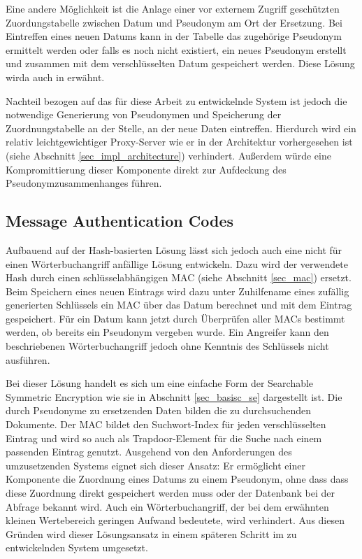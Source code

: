 Eine andere Möglichkeit ist die Anlage einer vor externem Zugriff geschützten Zuordungstabelle zwischen Datum und Pseudonym am Ort der Ersetzung. Bei Eintreffen eines neuen Datums kann in der Tabelle das zugehörige Pseudonym ermittelt werden oder falls es noch nicht existiert, ein neues Pseudonym erstellt und zusammen mit dem verschlüsselten Datum gespeichert werden. Diese Lösung wirda auch in \cite{goh2003} erwähnt.

Nachteil bezogen auf das für diese Arbeit zu entwickelnde System ist jedoch die notwendige Generierung von Pseudonymen und Speicherung der Zuordnungstabelle an der Stelle, an der neue Daten eintreffen. Hierdurch wird ein relativ leichtgewichtiger Proxy-Server wie er in der Architektur vorhergesehen ist (siehe Abschnitt \ref{sec_impl_architecture}) verhindert. Außerdem würde eine Kompromittierung dieser Komponente direkt zur Aufdeckung des Pseudonymzusammenhanges führen. 

\subsection{Message Authentication Codes}

Aufbauend auf der Hash-basierten Lösung lässt sich jedoch auch eine nicht für einen Wörterbuchangriff anfällige Lösung entwickeln. Dazu wird der verwendete Hash durch einen schlüsselabhängigen MAC (siehe Abschnitt \ref{sec_mac}) ersetzt. Beim Speichern eines neuen Eintrags wird dazu unter Zuhilfename eines zufällig generierten Schlüssels ein MAC über das Datum berechnet und mit dem Eintrag gespeichert. Für ein Datum kann jetzt durch Überprüfen aller MACs bestimmt werden, ob bereits ein Pseudonym vergeben wurde. Ein Angreifer kann den beschriebenen Wörterbuchangriff jedoch ohne Kenntnis des Schlüssels nicht ausführen.

Bei dieser Lösung handelt es sich um eine einfache Form der Searchable Symmetric Encryption wie sie in Abschnitt \ref{sec_basisc_se} dargestellt ist. Die durch Pseudonyme zu ersetzenden Daten bilden die zu durchsuchenden Dokumente. Der MAC bildet den Suchwort-Index für jeden verschlüsselten Eintrag und wird so auch als Trapdoor-Element für die Suche nach einem passenden Eintrag genutzt. Ausgehend von den Anforderungen des umzusetzenden Systems eignet sich dieser Ansatz: Er ermöglicht einer Komponente die Zuordnung eines Datums zu einem Pseudonym, ohne dass dass diese Zuordnung direkt gespeichert werden muss oder der Datenbank bei der Abfrage bekannt wird. Auch ein Wörterbuchangriff, der bei dem erwähnten kleinen Wertebereich geringen Aufwand bedeutete, wird verhindert. Aus diesen Gründen wird dieser Lösungsansatz in einem späteren Schritt im zu entwickelnden System umgesetzt.

